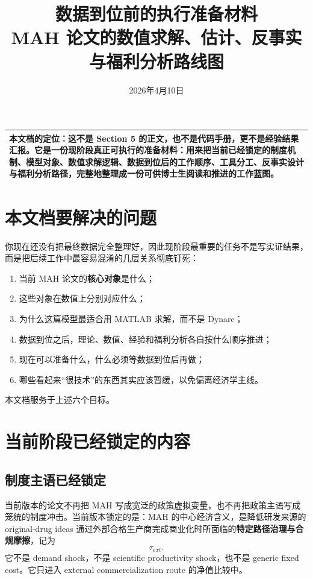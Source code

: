 \documentclass[12pt]{ctexart}
\title{数据到位前的执行准备材料\\
\large MAH 论文的数值求解、估计、反事实与福利分析路线图}
\author{}
\date{2026年4月10日}
\newcommand{\tauext}{\tau_{ext}}
\begin{document}
\maketitle
\thispagestyle{empty}

\begin{center}
\begin{tabular}{p{}}
\toprule
\textbf{本文档的定位}：这不是 Section 5 的正文，也不是代码手册，更不是经验结果汇报。它是一份\textbf{现阶段真正可执行的准备材料}：用来把当前已经锁定的制度机制、模型对象、数值求解逻辑、数据到位后的工作顺序、工具分工、反事实设计与福利分析路径，完整地整理成一份可供博士生阅读和推进的工作蓝图。\\
\bottomrule
\end{tabular}
\end{center}

\vspace{1em}

\section{本文档要解决的问题}

你现在还没有把最终数据完全整理好，因此现阶段最重要的任务不是写实证结果，而是把后续工作中最容易混淆的几层关系彻底钉死：

\begin{enumerate}[leftmargin=2em,itemsep=0.3em]
    \item 当前 MAH 论文的\textbf{核心对象}是什么；
    \item 这些对象在数值上分别对应什么；
    \item 为什么这篇模型最适合用 MATLAB 求解，而不是 Dynare；
    \item 数据到位之后，理论、数值、经验和福利分析各自按什么顺序推进；
    \item 现在可以准备什么，什么必须等数据到位后再做；
    \item 哪些看起来“很技术”的东西其实应该暂缓，以免偏离经济学主线。
\end{enumerate}

本文档服务于上述六个目标。

\section{当前阶段已经锁定的内容}

\subsection{制度主语已经锁定}
当前版本的论文不再把 MAH 写成宽泛的政策虚拟变量，也不再把政策主语写成笼统的制度冲击。当前版本锁定的是：MAH 的中心经济含义，是降低研发来源的 original-drug ideas 通过外部合格生产商完成商业化时所面临的\textbf{特定路径治理与合规摩擦}，记为
\[
\tauext.
\]
它不是 demand shock，不是 scientific productivity shock，也不是 generic fixed cost。它只进入 external commercialization route 的净值比较中。
\end{document}

